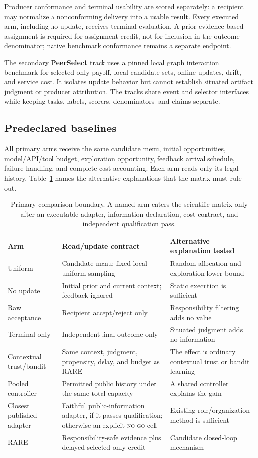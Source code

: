 \documentclass[sigconf,anonymous]{aamas}
\begin{document}
Producer conformance and terminal usability are scored separately: a recipient may normalize a nonconforming delivery into a usable result. Every executed arm, including no-update, receives terminal evaluation. A prior evidence-based assignment is required for assignment credit, not for inclusion in the outcome denominator; native benchmark conformance remains a separate endpoint.

The secondary \textbf{PeerSelect} track uses a pinned local graph interaction benchmark for selected-only payoff, local candidate sets, online updates, drift, and service cost. It isolates update behavior but cannot establish situated artifact judgment or producer attribution. The tracks share event and selector interfaces while keeping tasks, labels, scorers, denominators, and claims separate.

\subsection{Predeclared baselines}
All primary arms receive the same candidate menu, initial opportunities, model/API/tool budget, exploration opportunity, feedback arrival schedule, failure handling, and complete cost accounting. Each arm reads only its legal history. Table~\ref{tab:baselines} names the alternative explanations that the matrix must rule out.
\begin{table}[t]
\centering\small
\begin{tabular}{p{}p{}p{}}
\toprule
Arm & Read/update contract & Alternative explanation tested\\
\midrule
Uniform & Candidate menu; fixed local-uniform sampling & Random allocation and exploration lower bound\\
No update & Initial prior and current context; feedback ignored & Static execution is sufficient\\
Raw acceptance & Recipient accept/reject only & Responsibility filtering adds no value\\
Terminal only & Independent final outcome only & Situated judgment adds no information\\
Contextual trust/bandit & Same context, judgment, propensity, delay, and budget as RARE & The effect is ordinary contextual trust or bandit learning\\
Pooled controller & Permitted public history under the same total capacity & A shared controller explains the gain\\
Closest published adapter & Faithful public-information adapter, if it passes qualification; otherwise an explicit \textsc{no-go} cell & Existing role/organization method is sufficient\\
RARE & Responsibility-safe evidence plus delayed selected-only credit & Candidate closed-loop mechanism\\
\bottomrule
\end{tabular}
\caption{Primary comparison boundary. A named arm enters the scientific matrix only after an executable adapter, information declaration, cost contract, and independent qualification pass.}
\label{tab:baselines}
\end{table}
\end{document}
